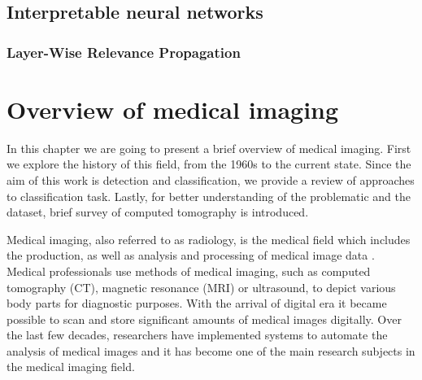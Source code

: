 \section{Interpretable neural networks}
\subsection{Layer-Wise Relevance Propagation}


\chapter{Overview of medical imaging}
In this chapter we are going to present a brief overview of medical imaging. First we explore the history of this field, from the 1960s to the current state. Since the aim of this work is detection and classification, we provide a review of approaches to classification task. Lastly, for better understanding of the problematic and the dataset, brief survey of computed tomography is introduced.

Medical imaging, also referred to as radiology, is the medical field which includes the production, as well as analysis and processing of medical image data \cite{diagnostic50years}. Medical professionals use methods of medical imaging, such as computed tomography (CT), magnetic resonance (MRI) or ultrasound, to depict various body parts for diagnostic purposes. With the arrival of digital era it became possible to scan and store significant amounts of medical images digitally. Over the last few decades, researchers have implemented systems to automate the analysis of medical images and it has become one of the main research subjects in the medical imaging field. 

